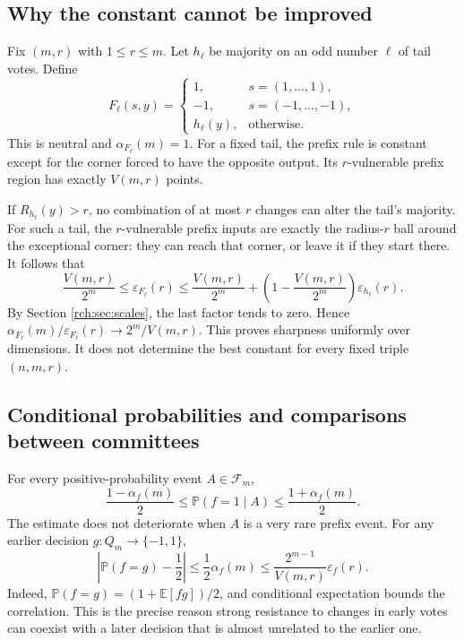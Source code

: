\documentclass[11pt]{article}
\theoremstyle{definition}
\theoremstyle{remark}
\newcommand{\E}{\mathbb E}
\newcommand{\Prb}{\mathbb P}
\newcommand{\cF}{\mathcal F}
\newcommand{\eps}{\varepsilon}
\newcommand{\vol}{V}
\begin{document}
\subsection{Why the constant cannot be improved}

Fix \((m,r)\) with \(1\le r\le m\). Let \(h_\ell\) be majority on an odd
number \(\ell\) of tail votes. Define
\begin{equation}
 F_\ell(s,y)=
 \begin{cases}
  1,&s=(1,\ldots,1),\\
 -1,&s=(-1,\ldots,-1),\\
 h_\ell(y),&\text{otherwise}.
 \end{cases}
 \label{rch:eq:sharpconstruction}
\end{equation}
This is neutral and \(\alpha_{F_\ell}(m)=1\). For a fixed tail, the prefix
rule is constant except for the corner forced to have the opposite output.
Its \(r\)-vulnerable prefix region has exactly \(\vol(m,r)\) points.

If \(R_{h_\ell}(y)>r\), no combination of at most \(r\) changes can alter
the tail's majority. For such a tail, the \(r\)-vulnerable prefix inputs are
exactly the radius-\(r\) ball around the exceptional corner: they can reach
that corner, or leave it if they start there. It follows that
\begin{equation}
 \frac{\vol(m,r)}{2^m}
 \le\eps_{F_\ell}(r)
 \le\frac{\vol(m,r)}{2^m}
   +\left(1-\frac{\vol(m,r)}{2^m}\right)\eps_{h_\ell}(r).
 \label{rch:eq:sharpsandwich}
\end{equation}
By Section \ref{rch:sec:scales}, the last factor tends to zero. Hence
\(\alpha_{F_\ell}(m)/\eps_{F_\ell}(r)\to2^m/\vol(m,r)\).
This proves sharpness uniformly over dimensions. It does not determine the
best constant for every fixed triple \((n,m,r)\).

\subsection{Conditional probabilities and comparisons between committees}

For every positive-probability event \(A\in\cF_m\),
\begin{equation}
 \frac{1-\alpha_f(m)}2
 \le\Prb(f=1\mid A)
 \le\frac{1+\alpha_f(m)}2.
 \label{rch:eq:history}
\end{equation}
The estimate does not deteriorate when \(A\) is a very rare prefix event.
For any earlier decision \(g:Q_m\to\{-1,1\}\),
\begin{equation}
 \left|\Prb(f=g)-\frac12\right|
 \le\frac12\alpha_f(m)
 \le\frac{2^{m-1}}{\vol(m,r)}\eps_f(r).
 \label{rch:eq:twocommittees}
\end{equation}
Indeed, \(\Prb(f=g)=(1+\E[fg])/2\), and conditional expectation bounds the
correlation. This is the precise reason strong resistance to changes in early
votes can coexist with a later decision that is almost unrelated to the earlier
one.
\end{document}
